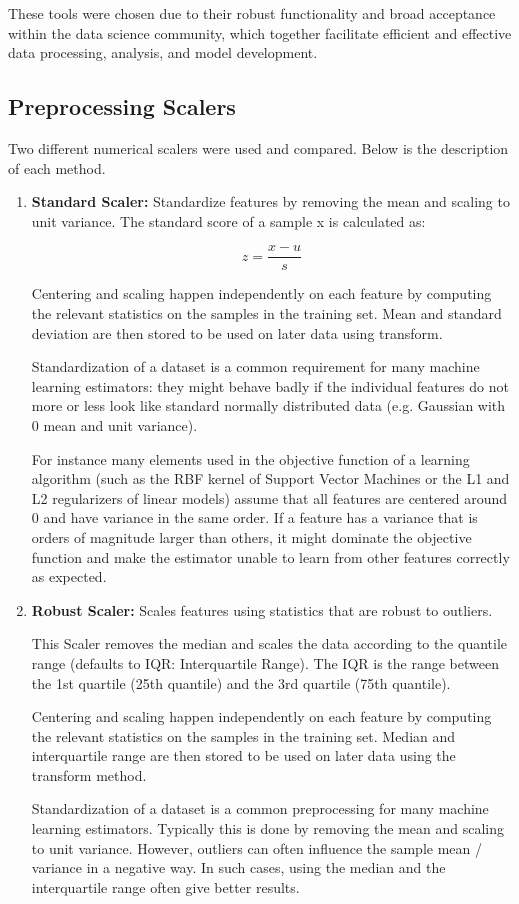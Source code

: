 \documentclass{article}
\theoremstyle{mytheoremstyle}
\theoremstyle{mytheoremstyle}
\theoremstyle{myproblemstyle}
\begin{document}
These tools were chosen due to their robust functionality and broad acceptance within the data science community, which together facilitate efficient and effective data processing, analysis, and model development.
\subsection{Preprocessing Scalers}
Two different numerical scalers were used and compared. Below is the description of each method. 
\begin{enumerate}
    \item \textbf{Standard Scaler: } Standardize features by removing the mean and scaling to unit variance. The standard score of a sample x is calculated as:
    
    \[z = \frac{x-u}{s}\]
    
Centering and scaling happen independently on each feature by computing the relevant statistics on the samples in the training set. Mean and standard deviation are then stored to be used on later data using transform.

Standardization of a dataset is a common requirement for many machine learning estimators: they might behave badly if the individual features do not more or less look like standard normally distributed data (e.g. Gaussian with 0 mean and unit variance).

For instance many elements used in the objective function of a learning algorithm (such as the RBF kernel of Support Vector Machines or the L1 and L2 regularizers of linear models) assume that all features are centered around 0 and have variance in the same order. If a feature has a variance that is orders of magnitude larger than others, it might dominate the objective function and make the estimator unable to learn from other features correctly as expected.

    \item \textbf{Robust Scaler: } Scales features using statistics that are robust to outliers.

    This Scaler removes the median and scales the data according to the quantile range (defaults to IQR: Interquartile Range). The IQR is the range between the 1st quartile (25th quantile) and the 3rd quartile (75th quantile).
    
    Centering and scaling happen independently on each feature by computing the relevant statistics on the samples in the training set. Median and interquartile range are then stored to be used on later data using the transform method.
    
    Standardization of a dataset is a common preprocessing for many machine learning estimators. Typically this is done by removing the mean and scaling to unit variance. However, outliers can often influence the sample mean / variance in a negative way. In such cases, using the median and the interquartile range often give better results.
\end{enumerate}
\end{document}
